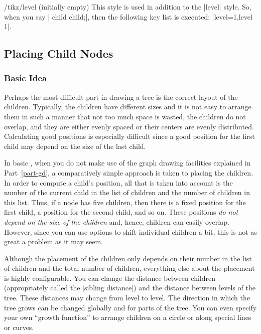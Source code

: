 \begin{stylekey}{/tikz/level  (initially \normalfont empty)}
    This style is used in addition to the |level| style. So, when you say
    | child child;|, then the following key list is executed:
    |level=1,level 1|.
\begin{codeexample}[]
\end{codeexample}
\end{stylekey}


\subsection{Placing Child Nodes}
\label{section-tree-placement}

\subsubsection{Basic Idea}

Perhaps the most difficult part in drawing a tree is the correct layout of the
children. Typically, the children have different sizes and it is not easy to
arrange them in such a manner that not too much space is wasted, the children
do not overlap, and they are either evenly spaced or their centers are evenly
distributed. Calculating good positions is especially difficult since a good
position for the first child may depend on the size of the last child.

In basic \tikzname, when you do not make use of the graph drawing facilities
explained in Part~\ref{part-gd}, a comparatively simple approach is taken to
placing the children. In order to compute a child's position, all that is taken
into account is the number of the current child in the list of children and the
number of children in this list. Thus, if a node has five children, then there
is a fixed position for the first child, a position for the second child, and
so on. These positions \emph{do not depend on the size of the children} and,
hence, children can easily overlap. However, since you can use options to shift
individual children a bit, this is not as great a problem as it may seem.

Although the placement of the children only depends on their number in the list
of children and the total number of children, everything else about the
placement is highly configurable. You can change the distance between children
(appropriately called the |sibling distance|) and the distance between levels
of the tree. These distances may change from level to level. The direction in
which the tree grows can be changed globally and for parts of the tree. You can
even specify your own ``growth function'' to arrange children on a circle or
along special lines or curves.


